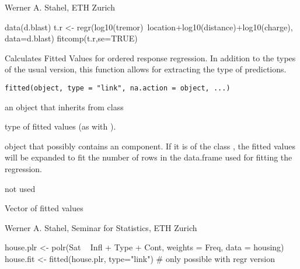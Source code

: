 \documentclass{article}
\begin{document}
\begin{Author}\relax
Werner A. Stahel, ETH Zurich
\end{Author}
\begin{SeeAlso}\relax
{}
\end{SeeAlso}
\begin{Examples}
\begin{ExampleCode}
data(d.blast)
t.r <- regr(log10(tremor)~location+log10(distance)+log10(charge), data=d.blast)
fitcomp(t.r,se=TRUE)
\end{ExampleCode}
\end{Examples}

\begin{Description}\relax
Calculates Fitted Values for ordered response regression.
In addition to the types of the usual version, this function allows
for extracting the  type of predictions.
\end{Description}
\begin{Usage}
\begin{verbatim}
fitted(object, type = "link", na.action = object, ...)
\end{verbatim}
\end{Usage}
\begin{Arguments}
\begin{ldescription}
\item[\code{object}] an object that inherits from class 
\item[\code{type}] type of fitted values (as with ).


\item[\code{na.action}] object that possibly contains an 
component. If it is of the class , the fitted values
will be expanded to fit the number of rows in the data.frame used
for fitting the regression.
\item[\code{...}] not used
\end{ldescription}
\end{Arguments}
\begin{Value}
Vector of fitted values
\end{Value}
\begin{Author}\relax
Werner A. Stahel, Seminar for Statistics, ETH Zurich
\end{Author}
\begin{Examples}
\begin{ExampleCode}
house.plr <- polr(Sat ~ Infl + Type + Cont, weights = Freq, data = housing)
house.fit <- fitted(house.plr, type="link") # only possible with regr version
\end{ExampleCode}
\end{Examples}
\end{document}

